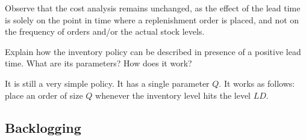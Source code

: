 \begin{exercise}
\begin{solution}
Observe that the cost analysis remains unchanged, as the effect of the lead time is solely on the point in time where a replenishment order is placed, and not on the frequency of orders and/or the actual stock levels. 

  \end{solution}
\end{exercise}




\begin{exercise}
Explain how the inventory policy can be described in presence of a positive lead time. What are its parameters? How does it work?


  \begin{solution}
It is still a very simple policy. It has a single parameter $Q$. It works as follows: place an order of size $Q$ whenever the inventory level hits the level $LD$.
  \end{solution}
\end{exercise}





\subsection{Backlogging}
\label{sec:backlogging}

